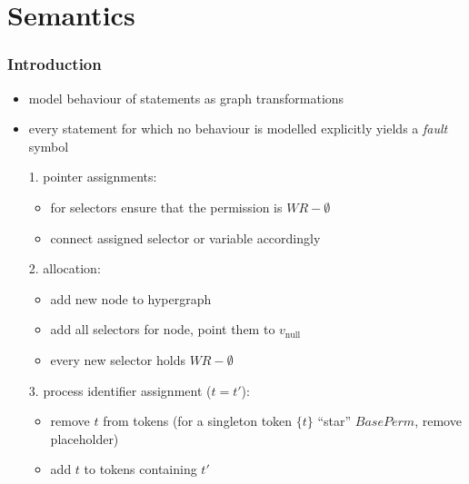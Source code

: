 \documentclass{beamer}
\begin{document}
\section{Semantics}
\begin{frame}
	\frametitle{Introduction}
	\begin{itemize}
		\item model behaviour of statements as graph transformations
		\item every statement for which no behaviour is modelled explicitly yields
			a \emph{fault} symbol
		\item[1.] pointer assignments:
			\begin{itemize}
				\item \alert{for selectors ensure that the permission is
					$\mathit{WR} - \emptyset$}
				\item connect assigned selector or variable accordingly
			\end{itemize}
		\item[2.] allocation:
			\begin{itemize}
				\item add new node to hypergraph
				\item add all selectors for node, point them to $v_{\text{null}}$
				\item \alert{every new selector holds $\mathit{WR}-\emptyset$}
			\end{itemize}
		\item[3.] \alert{process identifier assignment ($t = t'$):}
			\begin{itemize}
				\item \alert{remove $t$ from tokens (for
					a singleton token $\{t\}$ \enquote{star} $\mathit{BasePerm}$,
				remove placeholder)}
				\item \alert{add $t$ to tokens containing $t'$}
			\end{itemize}
	\end{itemize}
\end{frame}
\end{document}

